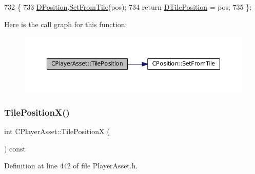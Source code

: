 \begin{DoxyCode}
732                                                         \{
733     \hyperlink{classCPlayerAsset_aa9f53c009b181c7c5647c6b03776a04c}{DPosition}.\hyperlink{classCPosition_a46994e6a8b8e3b4237edd7259ad844b6}{SetFromTile}(pos);
734     \textcolor{keywordflow}{return} \hyperlink{classCPlayerAsset_a5b59a9d3b7db8c7fa194b80dafb96186}{DTilePosition} = pos;
735 \};
\end{DoxyCode}
Here is the call graph for this function\+:
\nopagebreak
\begin{figure}[H]
\begin{center}
\leavevmode
\includegraphics[width=350pt]{classCPlayerAsset_a6d84105b6db136a6846fcaf80dba3747_cgraph}
\end{center}
\end{figure}
\hypertarget{classCPlayerAsset_aeabaa8fe7161cce571b6c4d2f7180085}{}\label{classCPlayerAsset_aeabaa8fe7161cce571b6c4d2f7180085} 
\subsubsection{\texorpdfstring{Tile\+Position\+X()}{TilePositionX()}\hspace{0.1cm}{\footnotesize\ttfamily [1/2]}}
{\footnotesize\ttfamily int C\+Player\+Asset\+::\+Tile\+PositionX (\begin{DoxyParamCaption}{ }\end{DoxyParamCaption}) const\hspace{0.3cm}{\ttfamily [inline]}}



Definition at line 442 of file Player\+Asset.\+h.


